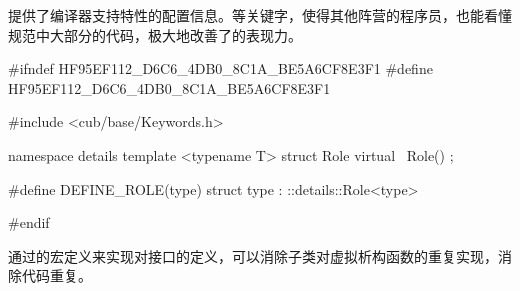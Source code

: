 \begin{content}
提供了编译器支持特性的配置信息。等关键字，使得其他阵营的程序员，也能看懂规范中大部分的代码，极大地改善了的表现力。

\begin{leftbar}
\begin{c++}[caption={\ttfamily{cub/base/Role.h}}]
#ifndef HF95EF112_D6C6_4DB0_8C1A_BE5A6CF8E3F1
#define HF95EF112_D6C6_4DB0_8C1A_BE5A6CF8E3F1

#include <cub/base/Keywords.h>

namespace details
{
   template <typename T>
   struct Role
   {
      virtual ~Role() {}
   };
}

#define DEFINE_ROLE(type) struct type : ::details::Role<type>

#endif
\end{c++}
\end{leftbar}

通过的宏定义来实现对接口的定义，可以消除子类对虚拟析构函数的重复实现，消除代码重复。

\end{content}

